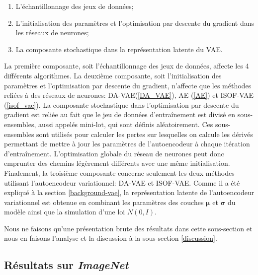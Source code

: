 \begin{enumerate}
	\item L'échantillonnage des jeux de données;
	\item L'initialisation des paramètres et l'optimisation par descente du gradient dans les réseaux de neurones;
	\item La composante stochastique dans la représentation latente du VAE.
\end{enumerate}

La première composante, soit l'échantillonnage des jeux de données, affecte les 4 différents algorithmes. La deuxième composante, soit l'initialisation des paramètres et l'optimisation par descente du gradient, n'affecte que les méthodes reliées à des réseaux de neurones: DA-VAE(\ref{DA_VAE}), AE (\ref{AE}) et ISOF-VAE (\ref{isof_vae}). La composante stochastique dans l'optimisation par descente du gradient est reliée au fait que le jeu de données d'entraînement est divisé en sous-ensembles, aussi appelés mini-lot, qui sont définis aléatoirement. Ces sous-ensembles sont utilisés pour calculer les pertes sur lesquelles on calcule les dérivés permettant de mettre à jour les paramètres de l'autoencodeur à chaque itération d'entraînement. L'optimisation globale du réseau de neurones peut donc emprunter des chemins légèrement différents avec une même initialisation. Finalement, la troisième composante concerne seulement les deux méthodes utilisant l'autoencodeur variationnel: DA-VAE et ISOF-VAE. Comme il a été expliqué à la section \ref{background-vae}, la représentation latente de l'autoencodeur variationnel est obtenue en combinant les paramètres des couches $\boldsymbol{\mu}$ et $\boldsymbol{\sigma}$ du modèle ainsi que la simulation d'une loi $N(0,I)$.

Nous ne faisons qu'une présentation brute des résultats dans cette sous-section et nous en faisons l'analyse et la discussion à la sous-section \ref{discussion}.


\subsection{Résultats sur \textit{ImageNet}} \label{results:imagenet}

